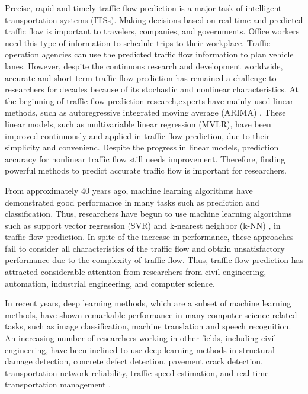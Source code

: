 \documentclass[twocolumn]{article}
\begin{document}
Precise, rapid and timely traffic flow prediction is a major task of intelligent transportation systems (ITSs)\citep{deeptrend}. Making decisions based on real-time and predicted traffic flow is important to travelers, companies, and governments\citep{7244203}. Office workers need this type of information to schedule trips to their workplace. Traffic operation agencies can use the predicted traffic flow information to plan vehicle lanes\citep{yuan2011driving,wu2018hybrid}. However, despite the continuous research and development worldwide, accurate and short-term traffic flow prediction has remained a challenge to researchers for decades because of its stochastic and nonlinear characteristics. At the beginning of traffic flow prediction research,experts have mainly used linear methods, such as autoregressive integrated moving average (ARIMA) \citep{ARIMA}. These linear models, such as multivariable linear regression (MVLR)\citep{MVLR}, have been improved continuously and applied in traffic flow prediction, due to their simplicity and convenienc.  Despite the progress in linear models, prediction accuracy for nonlinear traffic flow still needs improvement. Therefore, finding powerful methods to predict accurate traffic flow is important for researchers.
\par
From approximately 40 years ago, machine learning algorithms have demonstrated good performance in many tasks such as prediction and classification. Thus, researchers have begun to use machine learning algorithms such as support vector regression (SVR) \citep{SVR} and k-nearest neighbor (k-NN) \citep{k-NN}, in traffic flow prediction. In spite of the increase in performance, these approaches fail to consider all characteristics of the traffic flow and obtain unsatisfactory performance due to the complexity of traffic flow. Thus, traffic flow prediction has attracted considerable attention from researchers from civil engineering, automation, industrial engineering, and computer science.
\par
In recent years, deep learning methods, which are a subset of machine learning methods, have shown remarkable performance in many computer science-related tasks, such as image classification, machine translation and speech recognition. An increasing number of researchers working in other fields, including civil engineering, have been inclined to use deep learning methods in structural damage detection\citep{lin2017structural,cha2017deep,cha2017autonomous,maedaroad,gaodeep}, concrete defect detection\citep{li2018unified}, pavement crack detection\citep{zhang2017automated}, transportation network reliability\citep{nabian2018deep}, traffic speed estimation\citep{liu2018short}, and real-time transportation management \citep{hashemiend}. 
\end{document}
